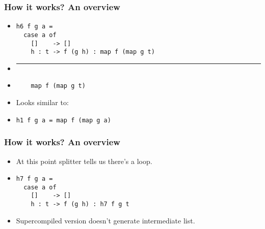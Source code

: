 \documentclass{beamer}
\begin{document}
\begin{frame}[fragile]
    \frametitle{How it works? An overview}
    \begin{itemize}
        \itemsep1em
        \item[]
            \begin{verbatim}
h6 f g a =
  case a of
    []    -> []
    h : t -> f (g h) : map f (map g t)

            \end{verbatim}

        \item[]
            \begin{center}
                \rule{4cm}{0.4pt}
            \end{center}

        \item[]
            \begin{verbatim}
    map f (map g t)
            \end{verbatim}

        \item[]
            Looks similar to:

        \item[]
            \begin{verbatim}
h1 f g a = map f (map g a)
            \end{verbatim}
    \end{itemize}
\end{frame}

\begin{frame}[fragile]
    \frametitle{How it works? An overview}
    \begin{itemize}
        \itemsep1em
        \item[]
            At this point splitter tells us there's a loop.

        \item[]
            \begin{verbatim}
h7 f g a =
  case a of
    []    -> []
    h : t -> f (g h) : h7 f g t
            \end{verbatim}

        \item[]
            Supercompiled version doesn't generate intermediate list.
    \end{itemize}
\end{frame}
\end{document}
